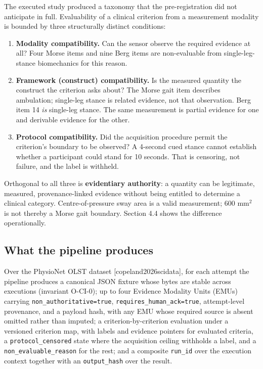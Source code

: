 \documentclass[11pt]{article}
\providecommand{\tightlist}{\setlength{\itemsep}{0pt}\setlength{\parskip}{0pt}}
\begin{document}
The executed study produced a taxonomy that the pre-registration did not anticipate in full. Evaluability of a clinical criterion from a measurement modality is bounded by three structurally distinct conditions:

\begin{enumerate}
\def\labelenumi{\arabic{enumi}.}
\tightlist
\item
  \textbf{Modality compatibility.} Can the sensor observe the required evidence at all? Four Morse items and nine Berg items are non-evaluable from single-leg-stance biomechanics for this reason.
\item
  \textbf{Framework (construct) compatibility.} Is the measured quantity the construct the criterion asks about? The Morse gait item describes ambulation; single-leg stance is related evidence, not that observation. Berg item 14 \emph{is} single-leg stance. The same measurement is partial evidence for one and derivable evidence for the other.
\item
  \textbf{Protocol compatibility.} Did the acquisition procedure permit the criterion's boundary to be observed? A 4-second cued stance cannot establish whether a participant could stand for 10 seconds. That is censoring, not failure, and the label is withheld.
\end{enumerate}

Orthogonal to all three is \textbf{evidentiary authority}: a quantity can be legitimate, measured, provenance-linked evidence without being entitled to determine a clinical category. Centre-of-pressure sway area is a valid measurement; 600 mm$^{2}$ is not thereby a Morse gait boundary. Section 4.4 shows the difference operationally.

\subsection{What the pipeline produces}\label{what-the-pipeline-produces}

Over the PhysioNet OLST dataset [copeland2026scidata], for each attempt the pipeline produces a canonical JSON fixture whose bytes are stable across executions (invariant O-CI-0); up to four Evidence Modality Units (EMUs) carrying \texttt{non\_authoritative=true}, \texttt{requires\_human\_ack=true}, attempt-level provenance, and a payload hash, with any EMU whose required source is absent omitted rather than imputed; a criterion-by-criterion evaluation under a versioned criterion map, with labels and evidence pointers for evaluated criteria, a \texttt{protocol\_censored} state where the acquisition ceiling withholds a label, and a \texttt{non\_evaluable\_reason} for the rest; and a composite \texttt{run\_id} over the execution context together with an \texttt{output\_hash} over the result.
\end{document}
